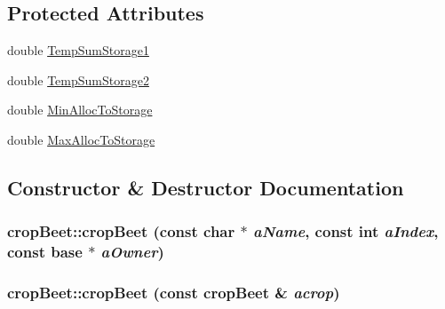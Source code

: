 \subsection*{Protected Attributes}
\begin{DoxyCompactItemize}
\item 
double \hyperlink{classcrop_beet_afb7dd14e41f2e9f9a74db2d474f94808}{TempSumStorage1}
\item 
double \hyperlink{classcrop_beet_ae4bed6a17efc19a31cca20121d0b5f44}{TempSumStorage2}
\item 
double \hyperlink{classcrop_beet_abfa5200bf40932d06448e7a6a678de83}{MinAllocToStorage}
\item 
double \hyperlink{classcrop_beet_abd20ec5c02e4df61d3c93f1074b15aa6}{MaxAllocToStorage}
\end{DoxyCompactItemize}


\subsection{Constructor \& Destructor Documentation}
\hypertarget{classcrop_beet_a31078128d157b876e757ab86a94a86c2}{
\subsubsection[{cropBeet}]{\setlength{\rightskip}{0pt plus 5cm}cropBeet::cropBeet (const char $\ast$ {\em aName}, \/  const int {\em aIndex}, \/  const {\bf base} $\ast$ {\em aOwner})}}
\label{classcrop_beet_a31078128d157b876e757ab86a94a86c2}
\hypertarget{classcrop_beet_a86e12275e8d30db6add7c11fe2a8e8a1}{
\subsubsection[{cropBeet}]{\setlength{\rightskip}{0pt plus 5cm}cropBeet::cropBeet (const {\bf cropBeet} \& {\em acrop})}}
\label{classcrop_beet_a86e12275e8d30db6add7c11fe2a8e8a1}


